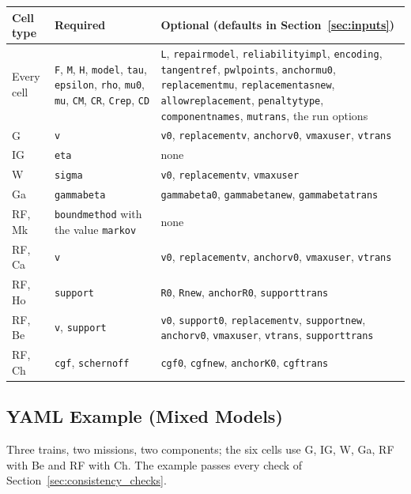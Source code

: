 \documentclass[11pt,a4paper]{article}
\makeatletter
\theoremstyle{plain}
\theoremstyle{definition}
\renewcommand{\_}{\textunderscore\allowbreak{}}
\providecommand{\typerow}[3]{{\raggedright #1\par} & {\raggedright #2\par} & {\raggedright #3\par} \\}
\providecommand{\tabstart}[2]{\begingroup\small\begin{longtable}{@{}#1@{}}\toprule #2 \\ \midrule \endhead}
\providecommand{\tabend}{\bottomrule\end{longtable}\endgroup}
\makeatother
\begin{document}
\tabstart{p{2.6cm}p{4.7cm}p{6.9cm}}{Cell type & Required & Optional (defaults in Section~\ref{sec:inputs})}
\typerow{Every cell}{\texttt{F}, \texttt{M}, \texttt{H}, \texttt{model}, \texttt{tau}, \texttt{epsilon}, \texttt{rho}, \texttt{mu\_0}, \texttt{mu}, \texttt{C\_M}, \texttt{C\_R}, \texttt{C\_rep}, \texttt{C\_D}}{\texttt{L}, \texttt{repair\_model}, \texttt{reliability\_impl}, \texttt{encoding}, \texttt{tangent\_ref}, \texttt{pwl\_points}, \texttt{anchor\_mu\_0}, \texttt{replacement\_mu}, \texttt{replacement\_as\_new}, \texttt{allow\_replacement}, \texttt{penalty\_type}, \texttt{component\_names}, \texttt{mu\_trans}, the run options}
\typerow{G}{\texttt{v}}{\texttt{v\_0}, \texttt{replacement\_v}, \texttt{anchor\_v\_0}, \texttt{v\_max\_user}, \texttt{v\_trans}}
\typerow{IG}{\texttt{eta}}{none}
\typerow{W}{\texttt{sigma}}{\texttt{v\_0}, \texttt{replacement\_v}, \texttt{v\_max\_user}}
\typerow{Ga}{\texttt{gamma\_beta}}{\texttt{gamma\_beta\_0}, \texttt{gamma\_beta\_new}, \texttt{gamma\_beta\_trans}}
\typerow{RF, Mk}{\texttt{bound\_method} with the value \texttt{markov}}{none}
\typerow{RF, Ca}{\texttt{v}}{\texttt{v\_0}, \texttt{replacement\_v}, \texttt{anchor\_v\_0}, \texttt{v\_max\_user}, \texttt{v\_trans}}
\typerow{RF, Ho}{\texttt{support}}{\texttt{R\_0}, \texttt{R\_new}, \texttt{anchor\_R\_0}, \texttt{support\_trans}}
\typerow{RF, Be}{\texttt{v}, \texttt{support}}{\texttt{v\_0}, \texttt{support\_0}, \texttt{replacement\_v}, \texttt{support\_new}, \texttt{anchor\_v\_0}, \texttt{v\_max\_user}, \texttt{v\_trans}, \texttt{support\_trans}}
\typerow{RF, Ch}{\texttt{cgf}, \texttt{s\_chernoff}}{\texttt{cgf\_0}, \texttt{cgf\_new}, \texttt{anchor\_K\_0}, \texttt{cgf\_trans}}
\tabend

\subsection{YAML Example (Mixed Models)}\label{sec:schema_example}

Three trains, two missions, two components; the six cells use G, IG, W, Ga, RF with Be and RF with Ch.
The example passes every check of Section~\ref{sec:consistency_checks}.
\end{document}
